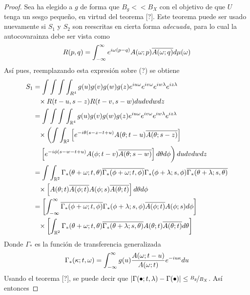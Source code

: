 \begin{proof}
Sea ha elegido a $g$ de forma que $B_g << B_X$ con el objetivo de que $U$ tenga un sesgo pequeño, en virtud del teorema [?]. Este teorema puede ser usado nuevamente si $S_1$ y $S_2$ son reescritas en cierta forma \textit{adecuada}, para lo cual la autocovarainza debe ser vista como
\begin{equation}
R(p,q) = \int_{-\infty}^{\infty} e^{i \omega (p-q)} A(\omega; p)\overline{A(\omega; q)} d\mu(\omega) 
\end{equation}
Así pues, reemplazando esta expresión sobre (?) se obtiene
\begin{align*}
S_1 &=
\int \int \int \int_{R^{4}} g(u) g(v) g(w) g(z) e^{i u \omega} e^{i v \omega} e^{i w \lambda} e^{i z \lambda} \\
&\pheq \times R(t-u,s-z)R(t-v,s-w) du dv dw dz \\
&= 
\int \int \int \int_{\R^{4}} g(u) g(v) g(w) g(z) e^{i u \omega} e^{i v \omega} e^{i w \lambda} e^{i z \lambda} \\
&\pheq \times \left( 
\int \int_{\R^{2}} 
\left[ 
e^{-i \theta (s-z-t+u)} A(\theta; t-u) \overline{A(\theta; s-z)} 
\right] 
\right. \\
&\pheq 
\left. \vphantom{\int}
\left[ e^{-i \phi (s-w-t+u)} A(\phi; t-v) \overline{A(\theta; s-w)} \right] d\theta d\phi
\right) du dv dw dz
\\
 &= \int \int_{\R^{2}} \Gamma_*(\theta+ \omega; t, \theta) \overline{\Gamma_*(\phi + \omega; t, \phi)}
 \Gamma_*(\phi+ \lambda; s, \phi) \overline{\Gamma_*(\theta + \lambda; s, \theta)} \\
 &\pheq \times
 \left[
 A(\theta; t) \overline{A(\phi; t)} A(\phi; s) \overline{A(\theta; t)}
 \right] d\theta d\phi
\\
 &= \left[ \intR \overline{\Gamma_*(\phi + \omega; t, \phi)} \Gamma_*(\phi+ \lambda; s, \phi)
 \overline{A(\phi; t)} A(\phi; s) d\phi \right] \\
 &\pheq \times \left[ \int_{\R^{2}} \Gamma_*(\theta+ \omega; t, \theta) 
  \overline{\Gamma_*(\theta + \lambda; s, \theta)}  
 A(\theta; t)   \overline{A(\theta; t)} d\theta \right] 
\end{align*}
Donde $\Gamma_*$ es la función de transferencia generalizada
\begin{equation}
\Gamma_*(\kappa; t, \omega) = \int_{-\infty}^{\infty} g(u) \frac{A(\omega; t-u)}{A(\omega; t)} e^{-i u \kappa} du
\end{equation}
Usando el teorema [?], se puede decir que $\left| \Gamma(\bullet; t, \lambda) - \Gamma(\bullet) \right| \leq \nicefrac{B_g}{B_X}$. Así entonces

\end{proof}
